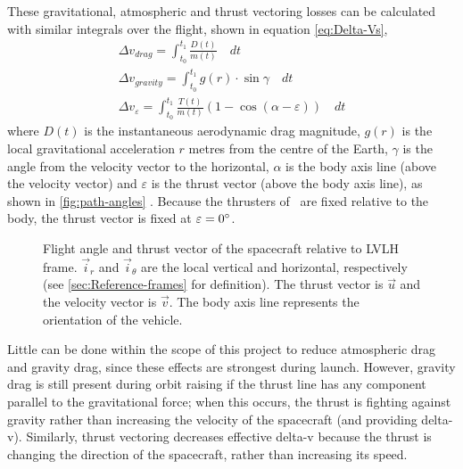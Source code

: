 These gravitational, atmospheric and thrust vectoring losses can be calculated with similar integrals over the flight, shown in equation \eqref{eq:Delta-Vs},
\begin{subequations} \label{eq:Delta-Vs}
\begin{gather}
\Delta v_{drag}=\int_{t_0}^{t_1}\frac{D(t)}{m(t)}\quad dt \label{eq:drag-penalty} \\
\Delta v_{gravity}=\int_{t_0}^{t_1}g(r)\cdot\sin\gamma\quad dt \label{eq:gravity-penalty} \\
\Delta v_\varepsilon=\int_{t_0}^{t_1}\frac{T(t)}{m(t)}(1-\cos(\alpha-\varepsilon))\quad dt \label{eq:thrust-vectoring-penalty}
\end{gather}
\end{subequations}
where $D(t)$ is the instantaneous aerodynamic drag magnitude, $g(r)$ is the local gravitational acceleration $r$ metres from the centre of the Earth, $\gamma$ is the angle from the velocity vector to the horizontal, $\alpha$ is the body axis line (above the velocity vector) and $\varepsilon$ is the thrust vector (above the body axis line), as shown in \autoref{fig:path-angles} \parencite{Tetlow2003}. Because the thrusters of \BW\ are fixed relative to the body, the thrust vector is fixed at $\varepsilon=0^\circ$.

\begin{figure}
\centering
\def\svgwidth{0.4\textwidth}

\caption{Flight angle and thrust vector of the spacecraft relative to LVLH frame. $\vec{i}_r$ and $\vec{i}_\theta$ are the local vertical and horizontal, respectively (see \autoref{sec:Reference-frames} for definition). The thrust vector is $\vec{u}$ and the velocity vector is $\vec{v}$. The body axis line represents the orientation of the vehicle.} 
\label{fig:path-angles}
\end{figure}

Little can be done within the scope of this project to reduce atmospheric drag and gravity drag, since these effects are strongest during launch. However, gravity drag is still present during orbit raising if the thrust line has any component parallel to the gravitational force; when this occurs, the thrust is fighting against gravity rather than increasing the velocity of the spacecraft (and providing delta-v). Similarly, thrust vectoring decreases effective delta-v because the thrust is changing the direction of the spacecraft, rather than increasing its speed. 
 
